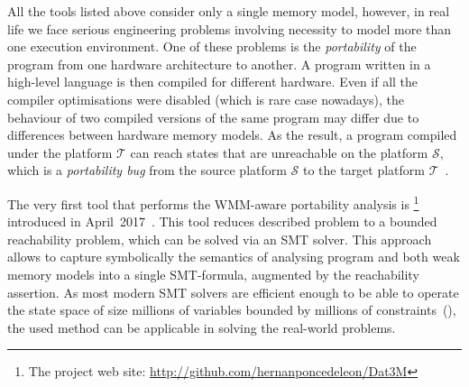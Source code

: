 
All the tools listed above consider only a single memory model, however, in real life we face serious engineering problems involving necessity to model more than one execution environment.
One of these problems is the \textit{portability} of the program from one hardware architecture to another.
A program written in a high-level language is then compiled for different hardware.
Even if all the compiler optimisations were disabled (which is rare case nowadays), the behaviour of two compiled versions of the same program may differ due to differences between hardware memory models.
As the result, a program compiled under the platform $\mathcal{T}$ can reach states that are unreachable on the platform $\mathcal{S}$, which is a \textit{portability bug} from the source platform $\mathcal{S}$ to the target platform $\mathcal{T}$~\cite{Porthos17a}.

The very first tool that performs the WMM-aware portability analysis is \porthos%
%
\footnote{The \porthos{} project web site: \url{http://github.com/hernanponcedeleon/Dat3M}} %
%
introduced in April~2017~\cite{Porthos17b}.
This tool reduces described problem to a bounded reachability problem, which can be solved via an SMT solver.
This approach allows to capture symbolically the semantics of analysing program and both weak memory models into a single SMT-formula, augmented by the reachability assertion.
As most modern SMT solvers are efficient enough to be able to operate the state space of size millions of variables bounded by millions of constraints~(\cite{malik2009boolean}), the used method can be applicable in solving the real-world problems.


